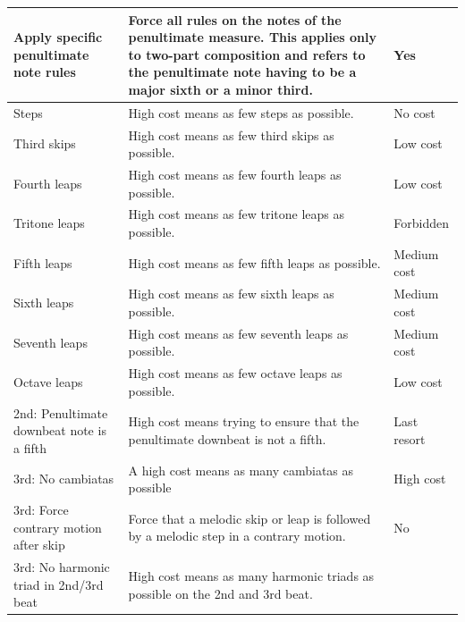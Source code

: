 \begin{table}[h!]
\begin{adjustbox}{center}
\begin{tabular}{|m{}|m{}|m{}<{\centering}|}
        \cellcolor[HTML]{C8D6FF}Apply specific penultimate note rules &
          Force all rules on the notes of the penultimate measure. This applies only to two-part composition and  refers to the penultimate note having to be a major sixth or a minor third. &
          Yes \\ \hline
        \hline
        \cellcolor[HTML]{BCE08D}Steps &
          High cost means as few steps as possible. &
          No cost \\ \hline
        \cellcolor[HTML]{BCE08D}Third skips &
          High cost means as few third skips as possible. &
          Low cost \\ \hline
        \cellcolor[HTML]{BCE08D}Fourth leaps &
          High cost means as few fourth leaps as possible. &
          Low cost \\ \hline
        \cellcolor[HTML]{BCE08D}Tritone leaps&
          High cost means as few tritone leaps as possible. &
          Forbidden \\ \hline
        \cellcolor[HTML]{BCE08D}Fifth leaps&
          High cost means as few fifth leaps as possible. &
          Medium cost \\ \hline
        \cellcolor[HTML]{BCE08D}Sixth leaps&
          High cost means as few sixth leaps as possible. &
          Medium cost \\ \hline
        \cellcolor[HTML]{BCE08D}Seventh leaps&
          High cost means as few seventh leaps as possible. &
          Medium cost \\ \hline
        \cellcolor[HTML]{BCE08D}Octave leaps&
          High cost means as few octave leaps as possible. &
          Low cost \\ \hline
        \hline      
        \cellcolor[HTML]{FFCE93}2nd: Penultimate downbeat note is a fifth &
          High cost means trying to ensure that the penultimate downbeat is not a fifth.&
          Last resort \\ \hline
        \cellcolor[HTML]{FFCE93}3rd: No cambiatas &
          A high cost means as many cambiatas as possible &
          High cost \\ \hline
        \cellcolor[HTML]{FFCE93}3rd: Force contrary motion after skip &
          Force that a melodic skip or leap is followed by a melodic step in a contrary motion. &
          No \\ \hline
        \cellcolor[HTML]{FFCE93}3rd: No harmonic triad in 2nd/3rd beat &
          High cost means as many harmonic triads as possible on the 2nd and 3rd beat.&

\end{tabular}
\end{adjustbox}
\end{table}
